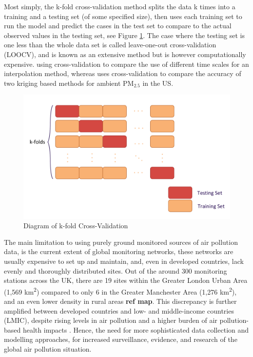 Most simply, the k-fold cross-validation method splits the data k times into a training and a testing set (of some specified size), then uses each training set to run the model and predict the cases in the test set to compare to the actual observed values in the testing set, see Figure \ref{fig:cross validation}. The case where the testing set is one less than the whole data set is called leave-one-out cross-validation (LOOCV), and is known as an extensive method but is however computationally expensive. \cite{Li2016SpatiotemporalApplication} using cross-validation to compare the use of different time scales for an interpolation method, whereas \cite{Lee2012ComparisonStates} uses cross-validation to compare the accuracy of two kriging based methods for ambient PM$_{2.5}$ in the US.

\begin{figure}
    \centering
    \includegraphics[width=0.7\linewidth]{Images/Cross-Validation.pdf}
\caption{Diagram of k-fold Cross-Validation}
\label{fig:cross validation}
\end{figure}

The main limitation to using purely ground monitored sources of air pollution data, is the current extent of global monitoring networks, these networks are usually expensive to set up and maintain, and, even in developed countries, lack evenly and thoroughly distributed sites. Out of the around 300 monitoring stations across the UK, there are 19 sites within the Greater London Urban Area (1,569 km\textsuperscript{2}) compared to only 6 in the Greater Manchester Area (1,276 km\textsuperscript{2}), and an even lower density in rural areas \textbf{ref map}. This discrepancy is further amplified between developed countries and low- and middle-income countries (LMIC), despite rising levels in air pollution and a higher burden of air pollution-based health impacts \citep{Bartington2020PrevalenceCountries}. Hence, the need for more sophisticated data collection and modelling approaches, for increased surveillance, evidence, and research of the global air pollution situation.

